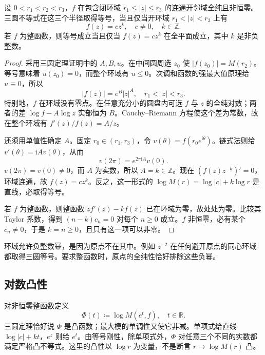\begin{proposition}[三圆等号的刚性]\label{b3:prop:19-three-circles-equality}
设 \(0<r_1<r_2<r_3\)，\(f\) 在包含闭环域 \(r_1\le|z|\le r_3\) 的连通开邻域全纯且非恒零。三圆不等式在这三个半径取得等号，当且仅当开环域 \(r_1<|z|<r_3\) 上有
\[
 f(z)=cz^k,\quad c\ne0,\quad k\in\mathbb Z.
\]
若 \(f\) 为整函数，则等号成立当且仅当 \(f(z)=cz^k\) 在全平面成立，其中 \(k\) 是非负整数。
\end{proposition}
\begin{proof}
采用三圆定理证明中的 \(A,B,u\)。在中间圆周选 \(z_0\) 使 \(|f(z_0)|=M(r_2)\)。等号意味着 \(u(z_0)=0\)，而整个环域有 \(u\le0\)。次调和函数的强最大值原理给 \(u\equiv0\)，所以
\[
 |f(z)|=e^B|z|^A,\quad r_1<|z|<r_3.
\]
特别地，\(f\) 在环域没有零点。在任意充分小的圆盘内可选 \(f\) 与 \(z\) 的全纯对数；两者的差 \(\log f-A\log z\) 实部恒为 \(B\)。Cauchy--Riemann 方程使这个差为常数，故在整个环域有 \(f'(z)/f(z)=A/z\)。

还须用单值性确定 \(A\)。固定 \(r_0\in(r_1,r_3)\)，令 \(v(\theta)=f(r_0e^{\mathrm{i}\theta})\)。链式法则给 \(v'(\theta)=\mathrm{i}A v(\theta)\)，从而
\[
 v(2\pi)=e^{2\pi\mathrm{i}A}v(0).
\]
\(v(2\pi)=v(0)\ne0\)，而 \(A\) 为实数，所以 \(A=k\in\mathbb Z\)。现在 \((f(z)z^{-k})'=0\)，环域连通，故 \(f(z)=cz^k\)。反之，这一形式的 \(\log M(r)=\log|c|+k\log r\) 是直线，必取得等号。

若 \(f\) 为整函数，则整函数 \(zf'(z)-kf(z)\) 已在环域为零，故处处为零。比较其 Taylor 系数，得到 \((n-k)c_n=0\) 对每个 \(n\ge0\) 成立。\(f\) 非恒零，必有某个 \(c_n\ne0\)，于是 \(k=n\ge0\)，且只有这一项可以非零。
\end{proof}
环域允许负整数幂，是因为原点不在其中。例如 \(z^{-2}\) 在任何避开原点的同心环域都取得三圆等号。要求整函数时，原点的全纯性恰好排除这些负幂。

\subsection{对数凸性}
\label{b3:subsec:190104}

对非恒零整函数定义
\[
 \Phi(t)\coloneqq\log M(e^t,f),\quad t\in\mathbb R.
\]
三圆定理恰好说 \(\Phi\) 是凸函数；最大模的单调性又使它非减。单项式给直线 \(\log|c|+kt\)，\(e^z\) 则给 \(e^t\)。由等号刚性，除单项式外，\(\Phi\) 对任意三个不同的实数都满足严格凸不等式。这里的凸性以 \(\log r\) 为变量，不是断言 \(r\mapsto\log M(r)\) 凸。


